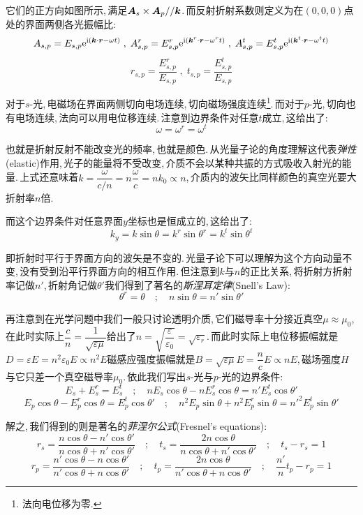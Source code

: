 \npg{-3cm}

它们的正方向如图所示,\,满足\(\boldsymbol{A}_s\times\boldsymbol{A}_p//\boldsymbol{k}\).\,而反射折射系数则定义为在\((0,0,0)\)点处的界面两侧各光振幅比:
\[A_{s,p}=E_{s,p}{\rm e}^{{\rm i}(\boldsymbol{k}\cdot \boldsymbol{r}-\omega t)}\; ,\; A_{s,p}^r=E_{s,p}^r {\rm e}^{{\rm i}(\boldsymbol{k}^r \cdot \boldsymbol{r}-\omega^r t)}\; ,\; A_{s,p}^t=E_{s,p}^t {\rm e}^{{\rm i}(\boldsymbol{k}^t \cdot \boldsymbol{r}-\omega^t t)}\]
\[r_{s,p}=\frac{E_{s,p}^r}{E_{s,p}}\; ,\; t_{s,p}=\frac{E_{s,p}^t}{E_{s,p}}\]

对于$s$-光,\,电磁场在界面两侧切向电场连续,\,切向磁场强度连续\footnote{法向电位移为零.}.\,而对于$p$-光,\,切向也有电场连续,\,法向可以用电位移连续.\,注意到边界条件对任意$t$成立,\,这给出了:
\[\omega=\omega^r=\omega^t\]

也就是折射反射不能改变光的频率,\,也就是颜色.\,从光量子论的角度理解这代表\emph{弹性}(elastic)作用,\,光子的能量将不受改变,\,介质不会以某种共振的方式吸收入射光的能量.\,上式还意味着\(k=\dfrac{\omega}{c/n}=n\dfrac{\omega}{c}=nk_0\propto n\),\,介质内的波矢比同样颜色的真空光要大折射率$n$倍.

而这个边界条件对任意界面$y$坐标也是恒成立的,\,这给出了:
\[k_y=k\sin\theta=k^r\sin\theta^r=k^t\sin\theta^t\]

即折射时平行于界面方向的波矢是不变的.\,光量子论下可以理解为这个方向动量不变,\,没有受到沿平行界面方向的相互作用.\,但注意到$k$与$n$的正比关系,\,将折射方折射率记做$n'$,\,折射角记做$\theta'$我们得到了著名的\emph{斯涅耳定律}(Snell's Law):
\[\theta^r=\theta \quad ;\quad n\sin\theta=n'\sin\theta'\]

再注意到在光学问题中我们一般只讨论透明介质,\,它们磁导率十分接近真空\(\mu\approx \mu_0\),\,在此时实际上\(\dfrac{c}{n}=\dfrac{1}{\sqrt{\varepsilon\mu}}\)给出了\(n=\sqrt{\dfrac{\varepsilon}{\varepsilon_0}}=\sqrt{\varepsilon_r}\).\,而此时实际上电位移振幅就是\(D=\varepsilon E=n^2\varepsilon_0 E\propto n^2 E\)磁感应强度振幅就是\(B=\sqrt{\varepsilon\mu}E=\dfrac{n}{c}E\propto nE\),\,磁场强度$H$与它只差一个真空磁导率$\mu_0$.\,依此我们写出$s$-光与$p$-光的边界条件:
\[E_s+E_s^r=E_s^t\quad ;\quad nE_s\cos\theta-nE_s^r\cos\theta=n'E_s^t\cos\theta'\]
\[E_p\cos\theta-E_p^r\cos\theta=E_p^t\cos\theta'\quad ;\quad n^2E_p\sin\theta+n^2E_p^r\sin\theta=n'^2E_p^t\sin\theta'\]

解之,\,我们得到的则是著名的\emph{菲涅尔公式}(Fresnel's equations):
\[r_s=\frac{n\cos\theta-n'\cos\theta'}{n\cos\theta+n'\cos\theta'}\quad ;\quad t_s=\frac{2n\cos\theta}{n\cos\theta+n'\cos\theta'}\quad ;\quad t_s-r_s=1\]
\[r_p=\frac{n'\cos\theta-n\cos\theta'}{n'\cos\theta+n\cos\theta'}\quad ;\quad t_p=\frac{2n\cos\theta}{n'\cos\theta+n\cos\theta'}\quad ;\quad \frac{n'}{n}t_p-r_p=1\]

